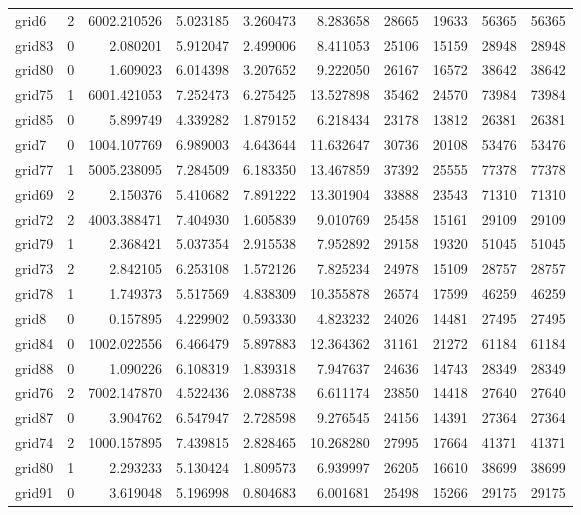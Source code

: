 \begin{longtable}{|l|r|r|r|r|r|r|r|r|r|}
grid6 & 2 & 6002.210526 & 5.023185 & 3.260473 & 8.283658 & 28665 & 19633 & 56365 & 56365 \\
grid83 & 0 & 2.080201 & 5.912047 & 2.499006 & 8.411053 & 25106 & 15159 & 28948 & 28948 \\
grid80 & 0 & 1.609023 & 6.014398 & 3.207652 & 9.222050 & 26167 & 16572 & 38642 & 38642 \\
grid75 & 1 & 6001.421053 & 7.252473 & 6.275425 & 13.527898 & 35462 & 24570 & 73984 & 73984 \\
grid85 & 0 & 5.899749 & 4.339282 & 1.879152 & 6.218434 & 23178 & 13812 & 26381 & 26381 \\
grid7 & 0 & 1004.107769 & 6.989003 & 4.643644 & 11.632647 & 30736 & 20108 & 53476 & 53476 \\
grid77 & 1 & 5005.238095 & 7.284509 & 6.183350 & 13.467859 & 37392 & 25555 & 77378 & 77378 \\
grid69 & 2 & 2.150376 & 5.410682 & 7.891222 & 13.301904 & 33888 & 23543 & 71310 & 71310 \\
grid72 & 2 & 4003.388471 & 7.404930 & 1.605839 & 9.010769 & 25458 & 15161 & 29109 & 29109 \\
grid79 & 1 & 2.368421 & 5.037354 & 2.915538 & 7.952892 & 29158 & 19320 & 51045 & 51045 \\
grid73 & 2 & 2.842105 & 6.253108 & 1.572126 & 7.825234 & 24978 & 15109 & 28757 & 28757 \\
grid78 & 1 & 1.749373 & 5.517569 & 4.838309 & 10.355878 & 26574 & 17599 & 46259 & 46259 \\
grid8 & 0 & 0.157895 & 4.229902 & 0.593330 & 4.823232 & 24026 & 14481 & 27495 & 27495 \\
grid84 & 0 & 1002.022556 & 6.466479 & 5.897883 & 12.364362 & 31161 & 21272 & 61184 & 61184 \\
grid88 & 0 & 1.090226 & 6.108319 & 1.839318 & 7.947637 & 24636 & 14743 & 28349 & 28349 \\
grid76 & 2 & 7002.147870 & 4.522436 & 2.088738 & 6.611174 & 23850 & 14418 & 27640 & 27640 \\
grid87 & 0 & 3.904762 & 6.547947 & 2.728598 & 9.276545 & 24156 & 14391 & 27364 & 27364 \\
grid74 & 2 & 1000.157895 & 7.439815 & 2.828465 & 10.268280 & 27995 & 17664 & 41371 & 41371 \\
grid80 & 1 & 2.293233 & 5.130424 & 1.809573 & 6.939997 & 26205 & 16610 & 38699 & 38699 \\
grid91 & 0 & 3.619048 & 5.196998 & 0.804683 & 6.001681 & 25498 & 15266 & 29175 & 29175 \\

\end{longtable}
